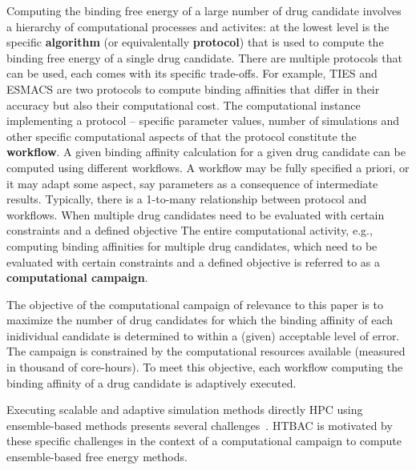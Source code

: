 Computing the binding free energy of a large number of drug candidate involves
a hierarchy of computational processes and activites: at the lowest level is
the specific {\bf algorithm} (or equivalentally {\bf protocol}) that is used
to compute the binding free energy of a single drug candidate. There are
multiple protocols that can be used, each comes with its specific trade-offs.
For example, TIES and ESMACS are two protocols to compute binding affinities
that differ in their accuracy but also their computational cost. The
computational instance implementing a protocol -- specific parameter values,
number of simulations and other specific computational aspects of that the
protocol constitute the {\bf workflow}. A given binding affinity calculation
for a given drug candidate can be computed using different workflows. A
workflow may be fully specified a priori, or it may adapt some aspect, say
parameters as a consequence of intermediate results. Typically, there is a
1-to-many relationship between protocol and workflows. When multiple drug
candidates need to be evaluated with certain constraints and a defined
objective The entire computational activity, e.g., computing binding
affinities for multiple drug candidates, which need to be evaluated with
certain constraints and a defined objective is referred to as a {\bf
computational campaign}.

The objective of the computational campaign of relevance to this paper is to
maximize the number of drug candidates for which the binding affinity of each
inidividual candidate is determined to within a (given) acceptable level of
error. The campaign is constrained by the computational resources available
(measured in thousand of core-hours). To meet this objective, each workflow
computing the binding affinity of a drug candidate is adaptively executed.

Executing scalable and adaptive simulation methods directly HPC using
ensemble-based methods presents several
challenges~\cite{cosb18,adaptivebiomolecular}. HTBAC is motivated by these
specific challenges in the context of a computational campaign to compute
ensemble-based free energy methods.



